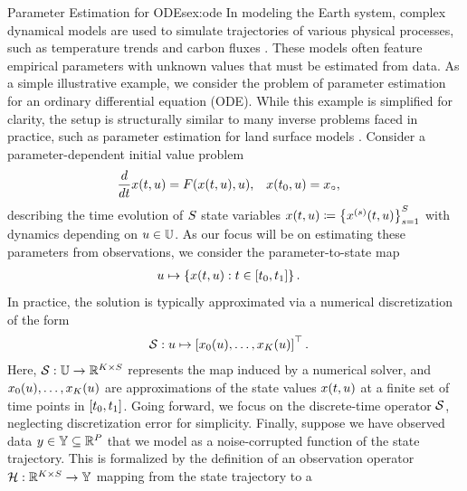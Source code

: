 \documentclass[12pt]{article}
\begin{document}
\begin{examplebox}{Parameter Estimation for ODEs}{ex:ode}
In modeling the Earth system, complex dynamical models are used to simulate trajectories
of various physical processes, such as temperature trends and carbon fluxes
 \citep{ESM_modeling_2pt0,paramLSM,idealizedGCM,FATES_CES,CLMBayesianCalibration,FerEmulation}.
These models often feature empirical parameters with unknown values that must be estimated from data.
As a simple illustrative example, we consider the problem of parameter estimation for an ordinary 
differential equation (ODE). While this example is simplified for clarity, the setup is structurally similar to many 
inverse problems faced in practice, such as parameter estimation for land surface models \citep{paramLSM}. 
Consider a parameter-dependent initial value problem 
\begin{align}
\frac{d}{d\Time} \state(\Time, \Par) &= \odeRHS(\state(\Time, \Par), \Par), &&x(\timeStart, \Par) = \stateIC, \label{ode_ivp}
\end{align}
describing the time evolution of $\dimState$ state variables 
$\state(\Time, \Par) \Def \left\{\indexState{\state}(\Time, \Par)\right\}_{\stateIndex=1}^{\dimState}$
with dynamics depending on $\Par \in \parSpace$. As our focus will be on estimating these parameters 
from observations, we consider the parameter-to-state map
\begin{align}
\Par &\mapsto \left\{\state(\Time, \Par) :  \Time \in [\timeStart, \timeEnd] \right\}.
\end{align}
In practice, the solution is typically approximated via a numerical discretization of the form 
\begin{align}
\solutionOp: \Par &\mapsto \left[\indexTime[0]{\state}(\Par), \dots, \indexTime[\NTimeStep]{\state}(\Par) \right]^\top. \label{eq:ode-solution-op}
\end{align}
Here, $\solutionOp: \parSpace \to \R^{\NTimeStep \times \dimState}$ represents the map induced by a numerical solver, 
and $\indexTime[0]{\state}(\Par), \dots, \indexTime[\NTimeStep]{\state}(\Par)$ are approximations of the state 
values $\state(\Time, \Par)$ at a finite set of time points in $[\timeStart, \timeEnd]$. 
Going forward, we focus on the discrete-time operator $\solutionOp$, neglecting discretization error
for simplicity. Finally, suppose we have observed data $\obs \in \obsSpace \subseteq \R^{\dimObs}$ that we model as a
noise-corrupted function of the state trajectory. This is formalized by the definition of an observation operator 
$\obsOp: \R^{\NTimeStep \times \dimState} \to \obsSpace$ mapping from the state trajectory to a 

\end{examplebox}
\end{document}
